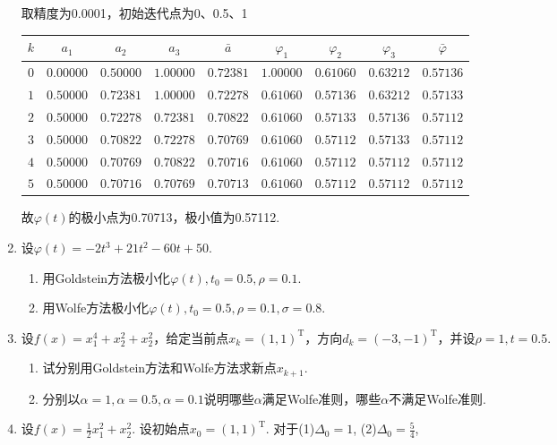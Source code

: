 \begin{enumerate}
    \sol 取精度为0.0001，初始迭代点为0、0.5、1
    {\small
    \begin{table}[H]
        \centering
        \begin{tabular}{|c|c|c|c|c|c|c|c|c|}
            \hline
            $k$ & $a_1$ & $a_2$ & $a_3$ & $\bar a$ & $\varphi_1$ & $\varphi_2$ & $\varphi_3$ & $\bar \varphi$ \\ \hline
            $0$ & $0.00000$ & $0.50000$ & $1.00000$ & $0.72381$ & $1.00000$ & $0.61060$ & $0.63212$ & $0.57136$ \\ \hline
            $1$ & $0.50000$ & $0.72381$ & $1.00000$ & $0.72278$ & $0.61060$ & $0.57136$ & $0.63212$ & $0.57133$ \\ \hline
            $2$ & $0.50000$ & $0.72278$ & $0.72381$ & $0.70822$ & $0.61060$ & $0.57133$ & $0.57136$ & $0.57112$ \\ \hline
            $3$ & $0.50000$ & $0.70822$ & $0.72278$ & $0.70769$ & $0.61060$ & $0.57112$ & $0.57133$ & $0.57112$ \\ \hline
            $4$ & $0.50000$ & $0.70769$ & $0.70822$ & $0.70716$ & $0.61060$ & $0.57112$ & $0.57112$ & $0.57112$ \\ \hline
            $5$ & $0.50000$ & $0.70716$ & $0.70769$ & $0.70713$ & $0.61060$ & $0.57112$ & $0.57112$ & $0.57112$ \\ \hline
        \end{tabular}
    \end{table}}
    故$\varphi(t)$的极小点为0.70713，极小值为0.57112.
    \item 设$\varphi(t)=-2t^3+21t^2-60t+50$.
    \begin{enumerate}[label=(\arabic*)]
        \item 用Goldstein方法极小化$\varphi(t),t_0=0.5,\rho=0.1$.
        \item 用Wolfe方法极小化$\varphi(t),t_0=0.5,\rho=0.1,\sigma=0.8$.
    \end{enumerate}
    \omitted
    \item 设$f(x)=x_1^4+x_2^2+x_2^2$，给定当前点$x_k=(1,1)^\mathrm{T}$，方向$d_k=(-3,-1)^\mathrm{T}$，并设$\rho=1,t=0.5$.
    \begin{enumerate}[label=(\arabic*)]
        \item 试分别用Goldstein方法和Wolfe方法求新点$x_{k+1}$.
        \item 分别以$\alpha=1,\alpha=0.5,\alpha=0.1$说明哪些$\alpha$满足Wolfe准则，哪些$\alpha$不满足Wolfe准则.
    \end{enumerate}
    \omitted
    \item 设$\displaystyle f(x)=\frac{1}{2}x_1^2+x_2^2$. 设初始点$x_0=(1,1)^\mathrm{T}$. 对于(1)$\Delta_0=1$, (2)$\displaystyle\Delta_0=\frac{5}{4}$,

\end{enumerate}
